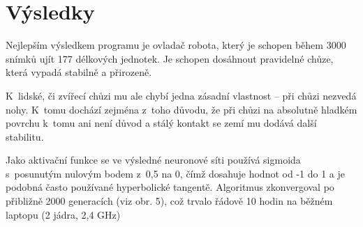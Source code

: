\documentclass[a4]{article}
\begin{document}
\section{Výsledky}
Nejlepším výsledkem programu je ovladač robota, který je schopen během 3000 snímků ujít 177 délkových jednotek. Je schopen dosáhnout pravidelné chůze, která vypadá stabilně a přirozeně.\cite{vid}\par 
K~lidské, či zvířecí chůzi mu ale chybí jedna zásadní vlastnost -- při chůzi nezvedá nohy. K~tomu dochází zejména z~toho důvodu, že při chůzi na absolutně hladkém povrchu k~tomu ani není důvod a stálý kontakt se zemí mu dodává další stabilitu.\par
Jako aktivační funkce se ve výsledné neuronové síti používá sigmoida s~posunutým nulovým bodem z~0,5 na 0, čímž dosahuje hodnot od -1 do 1 a je podobná často používané hyperbolické tangentě.
Algoritmus zkonvergoval po přibližně 2000 generacích (viz obr. 5), což trvalo řádově 10 hodin na běžném laptopu (2 jádra, 2,4 GHz)
\end{document}
